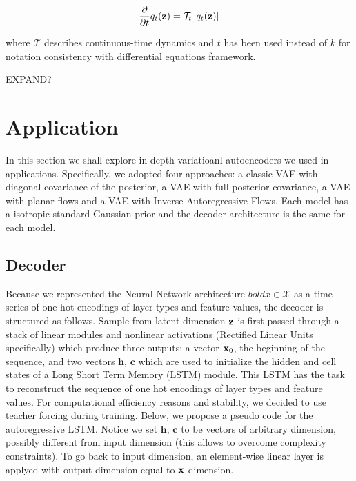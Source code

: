 \documentclass[12pt]{article}
\begin{document}
\begin{equation}
    \frac{\partial}{\partial t} q_t(\textbf{z}) = \mathcal{T}_t\left[q_t(\textbf{z})\right]
\end{equation}

where \(\mathcal{T}\) describes continuous-time dynamics \cite{Mohamed2015VariationalIM} and \(t\) has been used instead of \(k\) for notation consistency with differential equations framework. 

EXPAND?

\section{Application}

In this section we shall explore in depth variatioanl autoencoders we used in applications. Specifically, we adopted four approaches: a classic VAE with diagonal covariance of the posterior, a VAE with full posterior covariance, a VAE with planar flows and a VAE with Inverse Autoregressive Flows. Each model has a isotropic standard Gaussian prior and the decoder architecture is the same for each model.

\subsection{Decoder}

Because we represented the Neural Network architecture \(boldx \in \mathcal{X}\) as a time series of one hot encodings of layer types and feature values, the decoder is structured as follows. Sample from latent dimension \(\textbf{z}\) is first passed through a stack of linear modules and nonlinear activations (Rectified Linear Units specifically) which produce three outputs: a vector \(\textbf{x}_0\), the beginning of the sequence, and two vectors \(\mathbf{h}\), \(\mathbf{c}\) which are used to initialize the hidden and cell states of a Long Short Term Memory (LSTM) module. This LSTM has the task to reconstruct the sequence of one hot encodings of layer types and feature values. For computational efficiency reasons and stability, we decided to use teacher forcing during training. Below, we propose a pseudo code for the autoregressive LSTM. Notice we set \(\mathbf{h}\), \(\mathbf{c}\) to be vectors of arbitrary dimension, possibly different from input dimension (this allows to overcome complexity constraints). To go back to input dimension, an element-wise linear layer is applyed with output dimension equal to \(\textbf{x}\) dimension.
\end{document}
